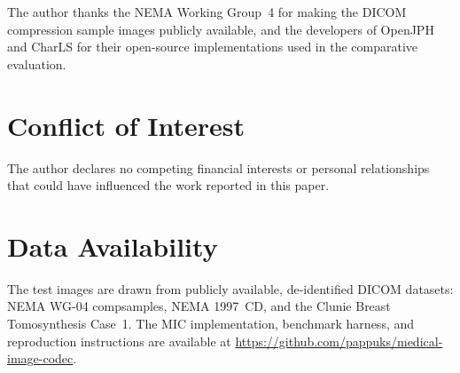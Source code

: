 \documentclass[journal]{IEEEtran}
\begin{document}
The author thanks the NEMA Working Group~4 for making the DICOM compression
sample images publicly available, and the developers of OpenJPH and CharLS for
their open-source implementations used in the comparative evaluation.

\section*{Conflict of Interest}

The author declares no competing financial interests or personal relationships
that could have influenced the work reported in this paper.

\section*{Data Availability}

The test images are drawn from publicly available, de-identified DICOM datasets:
NEMA WG-04 compsamples, NEMA 1997~CD, and the Clunie Breast Tomosynthesis
Case~1. The MIC implementation, benchmark harness, and reproduction instructions
are available at \url{https://github.com/pappuks/medical-image-codec}.

\end{document}
